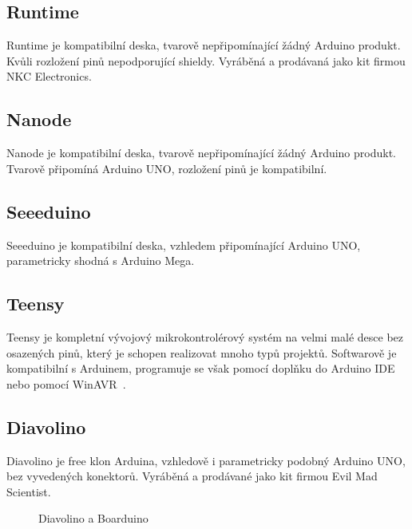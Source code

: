 	\subsection{Runtime} 
	Runtime je kompatibilní deska, tvarově nepřipomínající žádný Arduino produkt. Kvůli rozložení pinů nepodporující shieldy. Vyráběná a prodávaná jako kit firmou NKC Electronics.
	
	\subsection{Nanode} 
	Nanode je kompatibilní deska, tvarově nepřipomínající žádný Arduino produkt. Tvarově připomíná Arduino UNO, rozložení pinů je kompatibilní.
	
	\subsection{Seeeduino} 
	Seeeduino je kompatibilní deska, vzhledem připomínající Arduino UNO, parametricky shodná s Arduino Mega.
	
	\subsection{Teensy}
	Teensy je kompletní vývojový mikrokontrolérový systém na velmi malé desce bez osazených pinů, který je schopen realizovat mnoho typů projektů. Softwarově je kompatibilní s Arduinem, programuje se však pomocí doplňku do Arduino IDE nebo pomocí WinAVR~\cite{ArduinoTeensy}.
	
	\subsection{Diavolino} 
	Diavolino je free klon Arduina, vzhledově i parametricky podobný Arduino UNO, bez vyvedených konektorů. Vyráběná a prodávané jako kit firmou Evil Mad Scientist.
		
\begin{figure}[!ht]
    \centering
			\hspace*{5mm}
					\caption{Diavolino a Boarduino}
					\vspace{-30pt}	
	\end{figure}		
	

